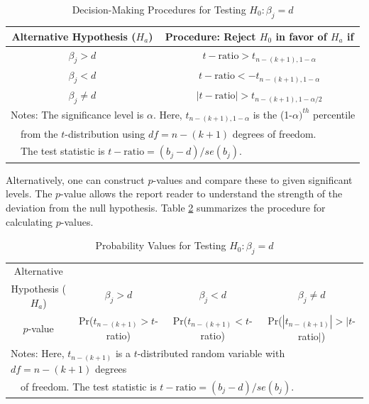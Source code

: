 \begin{table}[h]
\caption{\label{T3:Decisions} Decision-Making Procedures for Testing
$H_0: \beta_j = d$}
\begin{center}
\begin{tabular}{cc}
\hline Alternative Hypothesis ($H_{a}$) & Procedure: Reject $H_0$ in
favor of $ H_a$ if \\ \hline
$\beta_j > d$ & $t-\mathrm{ratio}>t_{n-(k+1),1-\alpha }$ \\
$\beta_j < d$ & $t-\mathrm{ratio}<-t_{n-(k+1),1-\alpha }$ \\
$\beta_j\neq d $ & $|t-\mathrm{ratio}\mathit{|}>t_{n-(k+1),1-\alpha
/2}$
\\ \hline
\multicolumn{2}{l}{Notes: The significance level is
$\alpha$. Here, $t_{n-(k+1),1-\alpha}$ is the (1-$\alpha)^{th}$ percentile} \\
\multicolumn{2}{l}{~~from the $t$-distribution using
$df=n-(k+1)$ degrees of freedom.} \\
\multicolumn{2}{l}{~~The test statistic is $t-\mathrm{ratio} = (b_j
-d)/se(b_j) $.} \\

\hline
\end{tabular}\end{center}\end{table}


Alternatively, one can construct $p$-values and compare these to
given significant levels. The $p$-value allows the report reader to
understand the strength of the deviation from the null hypothesis.
Table \ref{T3:Pvalues} summarizes the procedure for calculating
$p$-values.

\begin{table}[h]
\caption{\label{T3:Pvalues} Probability Values for Testing
$H_0:\beta_j =d$}
\begin{center}
\begin{tabular}{cccc}
\hline
Alternative &  &  &  \\
Hypothesis ($H_a $) & $\beta_j > d$ & $\beta_j < d$ & $\beta_j \neq d $ \\
\hline $p$-value & Pr($t_{n-(k+1)}>t$-ratio) &
Pr($t_{n-(k+1)}<t$-ratio) & Pr($|t_{n-(k+1)}|>|t$-ratio$|$) \\
\hline \multicolumn{4}{l}{Notes: Here, $t_{n-(k+1)}$
is a $t$-distributed random variable with $df=n-(k+1)$ degrees } \\
\multicolumn{4}{l}{~~of freedom. The test statistic is
$t-\mathrm{ratio} = (b_j -d)/se(b_j) $.} \\
 \hline
\end{tabular}\end{center}\end{table}

